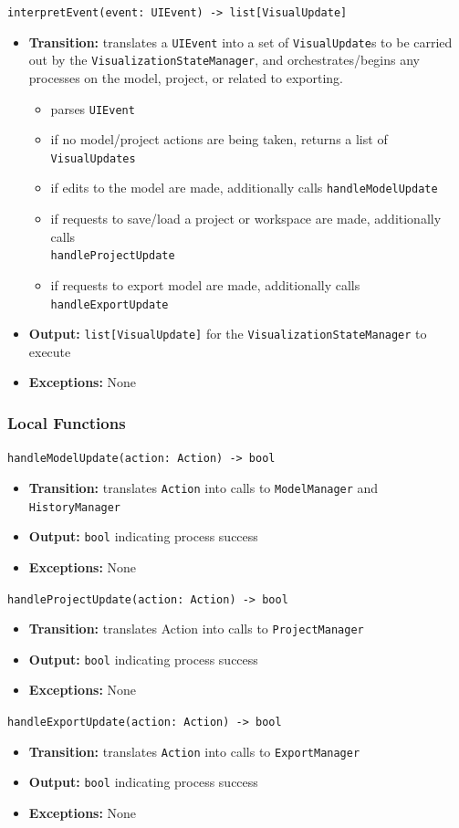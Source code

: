 \documentclass[12pt, titlepage]{article}
\begin{document}
\texttt{interpretEvent(event: UIEvent) -> list[VisualUpdate]}
\begin{itemize}
  \item \textbf{Transition:} translates a \texttt{UIEvent} into a set of \texttt{VisualUpdate}s to be carried out by the \texttt{VisualizationStateManager}, and orchestrates/begins any processes on the model, project, or related to exporting.
  \begin{itemize}
    \item parses \texttt{UIEvent}
    \item if no model/project actions are being taken, returns a list of \texttt{VisualUpdates}
    \item if edits to the model are made, additionally calls \texttt{handleModelUpdate}
    \item if requests to save/load a project or workspace are made, additionally calls \\ \texttt{handleProjectUpdate}
    \item if requests to export model are made, additionally calls \texttt{handleExportUpdate}
  \end{itemize}
  \item \textbf{Output:} \texttt{list[VisualUpdate]} for the \texttt{VisualizationStateManager} to execute
  \item \textbf{Exceptions:} None
\end{itemize}

\subsubsection{Local Functions}
\texttt{handleModelUpdate(action: Action) -> bool}
\begin{itemize}
  \item \textbf{Transition:} translates \texttt{Action} into calls to \texttt{ModelManager} and \texttt{HistoryManager}
  \item \textbf{Output:} \texttt{bool} indicating process success
  \item \textbf{Exceptions:} None
\end{itemize}
\texttt{handleProjectUpdate(action: Action) -> bool}
\begin{itemize}
  \item \textbf{Transition:} translates Action into calls to \texttt{ProjectManager}
  \item \textbf{Output:} \texttt{bool} indicating process success
  \item \textbf{Exceptions:} None
\end{itemize}
\texttt{handleExportUpdate(action: Action) -> bool}
\begin{itemize}
  \item \textbf{Transition:} translates \texttt{Action} into calls to \texttt{ExportManager}
  \item \textbf{Output:} \texttt{bool} indicating process success
  \item \textbf{Exceptions:} None
\end{itemize}
\end{document}
